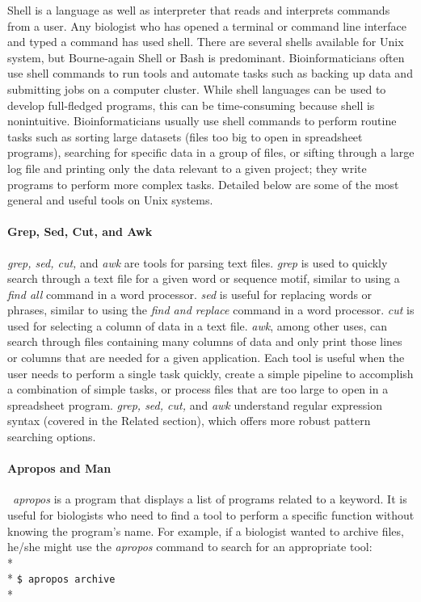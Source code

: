 \documentclass[ChapterTOCs,krantz2]{krantz} %
\begin{document}
Shell is a language as well as interpreter that reads and interprets commands
from a user. Any biologist who has opened a terminal or command line interface
and typed a command has used shell. There are several shells available for Unix
system, but Bourne-again Shell or Bash is predominant. 
Bioinformaticians often use shell commands to
run tools and automate tasks such as backing up
data and submitting jobs on a computer cluster. While shell languages can be
used to develop full-fledged programs, this can be time-consuming 
because shell is nonintuitive.  
Bioinformaticians usually use shell commands to perform routine tasks such as
sorting large datasets (files too big to open in spreadsheet programs),
searching for specific data in a group of files, or sifting through a large log
file and printing only the data relevant to a given project; they write programs to perform 
more complex tasks.  Detailed below are
some of the most general and useful tools on
Unix systems.

\paragraph{Grep, Sed, Cut, and Awk}

\emph{grep, sed, cut,} and \emph{awk} are tools for parsing text files.
\emph{grep} is used to
quickly search through a  text file for a given word or sequence
motif, similar to using a \emph{find all} command in a word processor.  \emph{sed} is
useful for replacing words or phrases,
similar to using the \emph{find and replace} command in a word processor.
\emph{cut} is
used for selecting a column of data in a text file.  \emph{awk}, among other uses, 
can search through files containing many columns of data and only print
those lines or columns that are needed for a given application.  
Each tool is useful when the user needs to
perform a single task quickly, create a simple pipeline to accomplish a
combination of simple tasks, or process files that are too large to open in a
spreadsheet program.  \emph{grep, sed, cut,} and \emph{awk} understand regular expression
syntax (covered in the Related section), which offers more robust pattern searching options.  

\paragraph{Apropos and Man}

\ \emph{apropos}
is a program that
displays a list of programs related to a keyword. It is
useful for biologists who need to find a tool to perform a specific function without 
knowing the program's name. For example, if a biologist wanted to archive files,
he/she might use the \emph{apropos} command to search for an appropriate tool:\\* \\*
\texttt{\$ apropos archive}\\*
\end{document}
